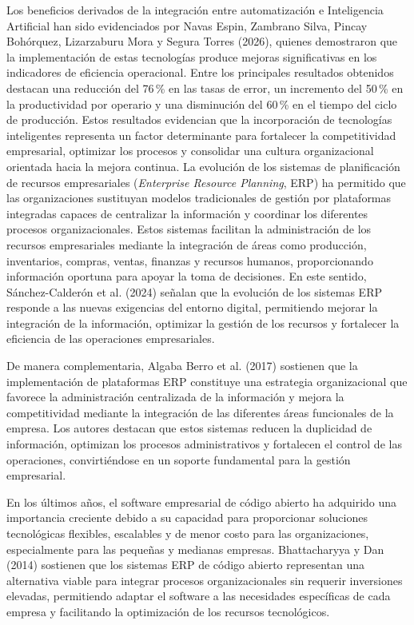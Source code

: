 Los beneficios derivados de la integración entre automatización e Inteligencia Artificial han sido evidenciados por Navas Espin, Zambrano Silva, Pincay Bohórquez, Lizarzaburu Mora y Segura Torres (2026), quienes demostraron que la implementación de estas tecnologías produce mejoras significativas en los indicadores de eficiencia operacional. Entre los principales resultados obtenidos destacan una reducción del 76\,\% en las tasas de error, un incremento del 50\,\% en la productividad por operario y una disminución del 60\,\% en el tiempo del ciclo de producción. Estos resultados evidencian que la incorporación de tecnologías inteligentes representa un factor determinante para fortalecer la competitividad empresarial, optimizar los procesos y consolidar una cultura organizacional orientada hacia la mejora continua.
La evolución de los sistemas de planificación de recursos empresariales (\textit{Enterprise Resource Planning}, ERP) ha permitido que las organizaciones sustituyan modelos tradicionales de gestión por plataformas integradas capaces de centralizar la información y coordinar los diferentes procesos organizacionales. Estos sistemas facilitan la administración de los recursos empresariales mediante la integración de áreas como producción, inventarios, compras, ventas, finanzas y recursos humanos, proporcionando información oportuna para apoyar la toma de decisiones. En este sentido, Sánchez-Calderón et al. (2024) señalan que la evolución de los sistemas ERP responde a las nuevas exigencias del entorno digital, permitiendo mejorar la integración de la información, optimizar la gestión de los recursos y fortalecer la eficiencia de las operaciones empresariales.

De manera complementaria, Algaba Berro et al. (2017) sostienen que la implementación de plataformas ERP constituye una estrategia organizacional que favorece la administración centralizada de la información y mejora la competitividad mediante la integración de las diferentes áreas funcionales de la empresa. Los autores destacan que estos sistemas reducen la duplicidad de información, optimizan los procesos administrativos y fortalecen el control de las operaciones, convirtiéndose en un soporte fundamental para la gestión empresarial.

En los últimos años, el software empresarial de código abierto ha adquirido una importancia creciente debido a su capacidad para proporcionar soluciones tecnológicas flexibles, escalables y de menor costo para las organizaciones, especialmente para las pequeñas y medianas empresas. Bhattacharyya y Dan (2014) sostienen que los sistemas ERP de código abierto representan una alternativa viable para integrar procesos organizacionales sin requerir inversiones elevadas, permitiendo adaptar el software a las necesidades específicas de cada empresa y facilitando la optimización de los recursos tecnológicos.

